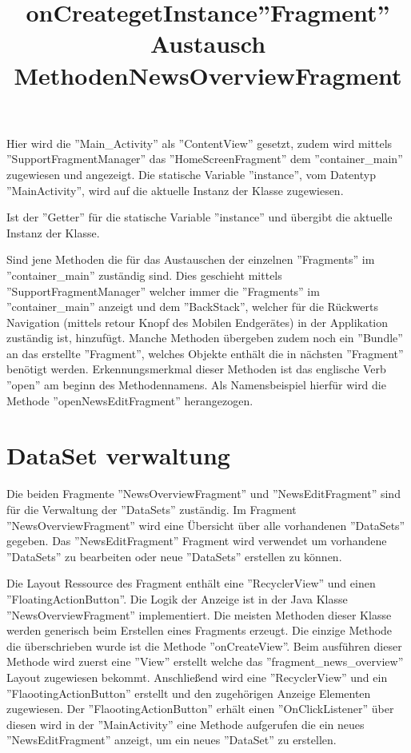 \title{onCreate}
Hier wird die ''Main\_Activity'' als ''ContentView'' gesetzt, zudem wird mittels ''SupportFragmentManager'' das ''HomeScreenFragment'' dem ''container\_main'' zugewiesen und angezeigt. Die statische Variable ''instance'', vom Datentyp ''MainActivity'', wird auf die aktuelle Instanz der Klasse zugewiesen. 
	
\title{getInstance}
 Ist der ''Getter'' für die statische Variable ''instance'' und übergibt die aktuelle Instanz der Klasse.
	
\title{''Fragment'' Austausch Methoden}
 Sind jene Methoden die für das Austauschen der einzelnen ''Fragments'' im ''container\_main'' zuständig sind. Dies geschieht mittels ''SupportFragmentManager'' welcher immer die ''Fragments'' im ''container\_main'' anzeigt und dem ''BackStack'', welcher für die Rückwerts Navigation (mittels retour Knopf des Mobilen Endgerätes) in der Applikation zuständig ist,  hinzufügt. Manche Methoden übergeben zudem noch ein ''Bundle'' an das erstellte ''Fragment'', welches Objekte enthält die in nächsten ''Fragment'' benötigt werden. Erkennungsmerkmal dieser Methoden ist das englische Verb ''open'' am beginn des Methodennamens. Als Namensbeispiel hierfür wird die Methode ''openNewsEditFragment'' herangezogen.





\section{DataSet verwaltung}
Die beiden Fragmente  ''NewsOverviewFragment'' und ''NewsEditFragment'' sind für die Verwaltung der ''DataSets'' zuständig. Im Fragment ''NewsOverviewFragment'' wird eine Übersicht über alle vorhandenen ''DataSets'' gegeben. Das ''NewsEditFragment'' Fragment wird verwendet um vorhandene ''DataSets'' zu bearbeiten oder neue ''DataSets'' erstellen zu können. 


\title{NewsOverviewFragment}
Die Layout Ressource des Fragment enthält eine ''RecyclerView'' und einen ''FloatingActionButton''. Die Logik der Anzeige ist in der Java Klasse ''NewsOverviewFragment'' implementiert. Die meisten Methoden dieser Klasse werden generisch beim Erstellen eines Fragments erzeugt. Die einzige Methode die überschrieben wurde ist die Methode ''onCreateView''. Beim ausführen dieser Methode wird zuerst eine ''View'' erstellt welche das ''fragment\_news\_overview'' Layout zugewiesen bekommt. Anschließend wird eine ''RecyclerView'' und ein ''FlaootingActionButton'' erstellt und den zugehörigen Anzeige Elementen zugewiesen. Der ''FlaootingActionButton'' erhält einen ''OnClickListener'' über diesen wird in der ''MainActivity'' eine Methode aufgerufen die ein neues ''NewsEditFragment'' anzeigt, um ein neues ''DataSet'' zu erstellen. 
